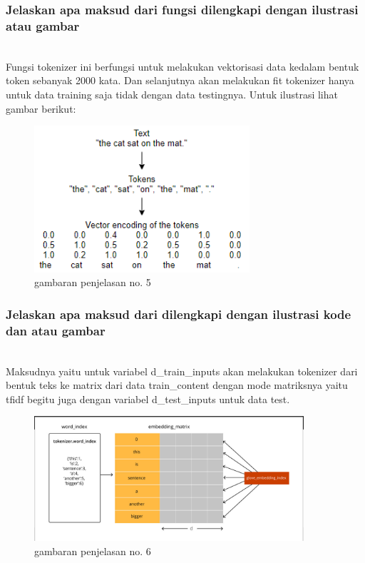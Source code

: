 \subsubsection{Jelaskan apa maksud dari fungsi dilengkapi dengan ilustrasi atau gambar}
\hfill\\
Fungsi tokenizer ini berfungsi untuk melakukan vektorisasi data kedalam bentuk token sebanyak 2000 kata. Dan selanjutnya akan melakukan fit tokenizer hanya untuk data training saja tidak dengan data testingnya. Untuk ilustrasi lihat gambar berikut: 
\begin{figure}[H]
	\centering
	\includegraphics[width=8cm]{figures/1174083/figures7/4.png}
	\caption{gambaran penjelasan no. 5}
\end{figure}

\subsubsection{Jelaskan apa maksud dari dilengkapi dengan ilustrasi kode dan atau gambar}
\hfill\\
Maksudnya yaitu untuk variabel d\_train\_inputs akan melakukan tokenizer dari bentuk teks ke matrix dari data train\_content dengan mode matriksnya yaitu tfidf begitu juga dengan variabel d\_test\_inputs untuk data test.
\begin{figure}[H]
	\centering
	\includegraphics[width=10cm]{figures/1174083/figures7/5.png}
	\caption{gambaran penjelasan no. 6}
\end{figure}

